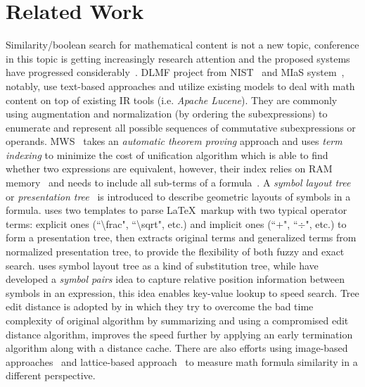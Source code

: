 \documentclass{acm_proc_article-sp}
\begin{document}
\pagebreak
\section{Related Work}
Similarity/boolean search for mathematical content is not a new topic,
conference in this topic is getting increasingly research attention and the proposed systems have progressed considerably~\cite{ov}.
DLMF project from NIST~\cite{Youssef03,Youssef05} and MIaS system~\cite{mias11a,mias11,mias:thesis}, notably, use text-based approaches and utilize existing models to deal with math content on top of existing IR tools (i.e. \textit{Apache Lucene}). 
They are commonly using augmentation and normalization (by ordering the subexpressions) to enumerate and represent all possible sequences of commutative subexpressions or operands.
MWS~\cite{Kohlhase06,Kohlhase0p5} takes an \textit{automatic theorem proving} approach and uses \textit{term indexing} to minimize the cost of unification algorithm which is able to find whether two expressions are equivalent, 
however, their index relies on RAM memory~\cite{Kohlhase0p5} and needs to include all sub-terms of a formula~\cite{Kohlhase06}.
A \textit{symbol layout tree} or \textit{presentation tree}~\cite{symbollayout12,WikiMirs13} is introduced to describe geometric layouts of symbols in a formula. 
\cite{WikiMirs13} uses two templates to parse \LaTeX\ markup with two typical operator terms: explicit ones (``\textbackslash frac", ``\textbackslash sqrt", etc.) and implicit ones (``$+$", ``$\div$", etc.) to form a presentation tree,
then extracts original terms and generalized terms from normalized presentation tree, to provide the flexibility of both fuzzy and exact search.
\cite{symbollayout12} uses symbol layout tree as a kind of substitution tree, while \cite{symbolpairs15,symbolpair15:2} have developed a \textit{symbol pairs} idea to capture relative position information between symbols in an expression,
this idea enables key-value lookup to speed search.
Tree edit distance is adopted by \cite{editdisXML11} in which they try to overcome the bad time complexity of original algorithm by summarizing and using a compromised edit distance algorithm, 
\cite{editdisXML13} improves the speed further by applying an early termination algorithm along with a distance cache.
There are also efforts using image-based approaches~\cite{imageb11,handwrite} and lattice-based approach~\cite{lattice} to measure math formula similarity in a different perspective.
\end{document}
